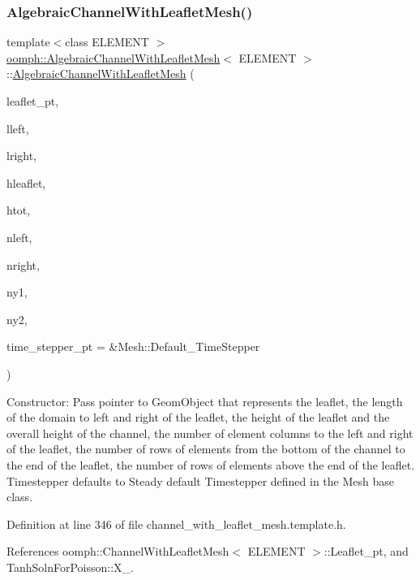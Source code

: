 \subsubsection{\texorpdfstring{Algebraic\+Channel\+With\+Leaflet\+Mesh()}{AlgebraicChannelWithLeafletMesh()}}
{\footnotesize\ttfamily template$<$class E\+L\+E\+M\+E\+NT $>$ \\
\hyperlink{classoomph_1_1AlgebraicChannelWithLeafletMesh}{oomph\+::\+Algebraic\+Channel\+With\+Leaflet\+Mesh}$<$ E\+L\+E\+M\+E\+NT $>$\+::\hyperlink{classoomph_1_1AlgebraicChannelWithLeafletMesh}{Algebraic\+Channel\+With\+Leaflet\+Mesh} (\begin{DoxyParamCaption}\item[{Geom\+Object $\ast$}]{leaflet\+\_\+pt,  }\item[{const double \&}]{lleft,  }\item[{const double \&}]{lright,  }\item[{const double \&}]{hleaflet,  }\item[{const double \&}]{htot,  }\item[{const unsigned \&}]{nleft,  }\item[{const unsigned \&}]{nright,  }\item[{const unsigned \&}]{ny1,  }\item[{const unsigned \&}]{ny2,  }\item[{Time\+Stepper $\ast$}]{time\+\_\+stepper\+\_\+pt = {\ttfamily \&Mesh\+:\+:Default\+\_\+TimeStepper} }\end{DoxyParamCaption})\hspace{0.3cm}{\ttfamily [inline]}}



Constructor\+: Pass pointer to Geom\+Object that represents the leaflet, the length of the domain to left and right of the leaflet, the height of the leaflet and the overall height of the channel, the number of element columns to the left and right of the leaflet, the number of rows of elements from the bottom of the channel to the end of the leaflet, the number of rows of elements above the end of the leaflet. Timestepper defaults to Steady default Timestepper defined in the Mesh base class. 



Definition at line 346 of file channel\+\_\+with\+\_\+leaflet\+\_\+mesh.\+template.\+h.



References oomph\+::\+Channel\+With\+Leaflet\+Mesh$<$ E\+L\+E\+M\+E\+N\+T $>$\+::\+Leaflet\+\_\+pt, and Tanh\+Soln\+For\+Poisson\+::\+X\+\_.

